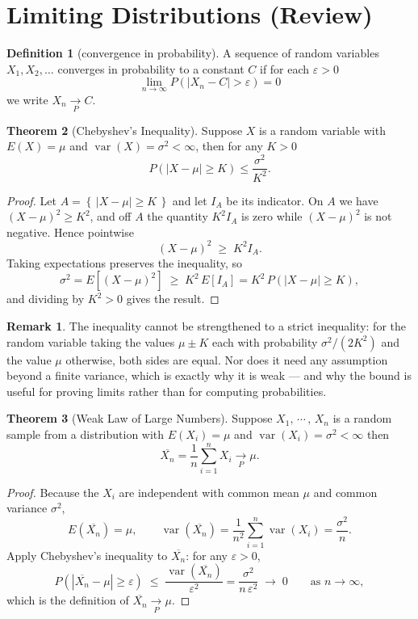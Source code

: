 \documentclass[12pt,a4paper]{report}
\theoremstyle{definition}
\newtheorem{thm}{Theorem}[section]
\newtheorem{defn}[thm]{Definition}
\newtheorem*{remark}{Remark}
\DeclareMathOperator{\var}{var}
\begin{document}
\section{Limiting Distributions (Review)}
\label{sec:limits}
\begin{defn}[convergence in probability]
A sequence of random variables $X_1, X_2, \dots$ converges in probability to a constant $C$ if for each $\varepsilon > 0$
\[\lim_{n\rightarrow \infty} P\left(\left|X_n - C\right| > \varepsilon\right) = 0\]
we write $X_n \underset{P}{\longrightarrow} C$.
\end{defn}

\begin{thm}[Chebyshev's Inequality]
 Suppose $X$ is a random variable with $E(X) = \mu$ and $\var (X) = \sigma^2 < \infty$, then for any $K > 0$
 \[P\left(\left|X - \mu\right| \geq K\right)  \leq \frac{\sigma^2}{K^2}.\]
\end{thm}

\begin{proof}
Let $A = \left\{\,\left|X-\mu\right| \geq K \,\right\}$ and let $I_A$ be its
indicator. On $A$ we have $(X-\mu)^2 \geq K^2$, and off $A$ the quantity
$K^2 I_A$ is zero while $(X-\mu)^2$ is not negative. Hence pointwise
\[(X-\mu)^2 \;\geq\; K^2 I_A .\]
Taking expectations preserves the inequality, so
\[\sigma^2 = E\left[(X-\mu)^2\right] \;\geq\; K^2\, E\left[I_A\right]
= K^2\, P\left(\left|X-\mu\right| \geq K\right),\]
and dividing by $K^2>0$ gives the result.
\end{proof}

\begin{remark}
The inequality cannot be strengthened to a strict inequality: for the random
variable taking the values $\mu \pm K$ each with probability
$\sigma^2/(2K^2)$ and the value $\mu$ otherwise, both sides are equal. Nor does
it need any assumption beyond a finite variance, which is exactly why it is
weak --- and why the bound is useful for proving limits rather than for
computing probabilities.
\end{remark}

\begin{thm}[Weak Law of Large Numbers]
Suppose $X_1, \, \cdots\, , \, X_n$ is a random sample from a distribution with $E(X_i)   = \mu$ and $\var (X_i) = \sigma^2 < \infty$ then  \[\overline{X_n} = \frac{1}{n}\sum^n_{i = 1} X_i \underset{P}{\longrightarrow} \mu.\]
\end{thm}

\begin{proof}
Because the $X_i$ are independent with common mean $\mu$ and common variance
$\sigma^2$,
\[E\left(\overline{X_n}\right) = \mu ,\qquad
\var\left(\overline{X_n}\right) = \frac{1}{n^2}\sum_{i=1}^{n}\var(X_i)
= \frac{\sigma^2}{n}.\]
Apply Chebyshev's inequality to $\overline{X_n}$: for any $\varepsilon>0$,
\[P\left(\left|\overline{X_n}-\mu\right| \geq \varepsilon\right)
\;\leq\; \frac{\var\left(\overline{X_n}\right)}{\varepsilon^{2}}
= \frac{\sigma^{2}}{n\,\varepsilon^{2}} \;\longrightarrow\; 0
\qquad\text{as } n\rightarrow\infty ,\]
which is the definition of $\overline{X_n}\underset{P}{\longrightarrow}\mu$.
\end{proof}
\end{document}
